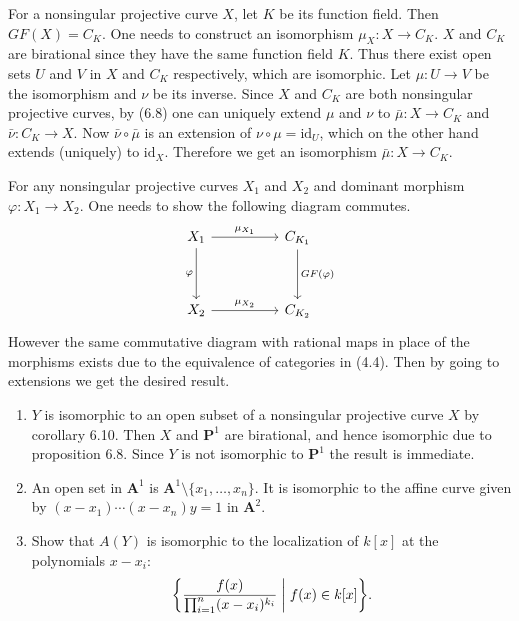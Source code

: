 \documentclass{note}
\newcommand{\Affine}[1]{\mathbf{A}^{#1}}
\newcommand{\Proj}[1]{\mathbf{P}^{#1}}
\newcommand{\id}{\mathrm{id}}
\begin{document}
For a nonsingular projective curve $X$, let $K$ be its function field. Then
$GF(X) = C_K$. One needs to construct an isomorphism $\mu_X\colon X\to C_K$.
$X$ and $C_K$ are birational since they have the same function field $K$. Thus
there exist open sets $U$ and $V$ in $X$ and $C_K$ respectively, which are
isomorphic. Let $\mu\colon U\to V$ be the isomorphism and $\nu$ be its inverse.
Since $X$ and $C_K$ are both nonsingular projective curves, by (6.8) one can
uniquely extend $\mu$ and $\nu$ to $\bar\mu\colon X\to C_K$ and $\bar\nu\colon
  C_K\to X$. Now $\bar\nu\circ\bar\mu$ is an extension of $\nu\circ\mu = \id_U$,
which on the other hand extends (uniquely) to $\id_X$. Therefore we get an
isomorphism $\bar\mu\colon X\to C_K$.

For any nonsingular projective curves $X_1$ and $X_2$ and dominant morphism
$\varphi\colon X_1\to X_2$. One needs to show the following diagram commutes.
\begin{equation*}
  \begin{tikzcd}[row sep=huge,column sep=huge]
    X_1 \arrow{r}{\mu_{X_1}} \arrow[swap]{d}{\varphi} & C_{K_1}
    \arrow{d}{GF(\varphi)} \\ X_2 \arrow{r}{\mu_{X_2}} & C_{K_2}
  \end{tikzcd}
\end{equation*}
However the same commutative diagram with rational maps in place of the
morphisms exists due to the equivalence of categories in (4.4). Then by going
to extensions we get the desired result.


\Ex
\begin{enumerate}
  \item $Y$ is isomorphic to an open subset of a nonsingular projective
        curve $X$ by corollary 6.10. Then $X$ and $\Proj1$ are birational, and hence
        isomorphic due to proposition 6.8. Since $Y$ is not isomorphic to $\Proj1$ the
        result is immediate.
  \item An open set in $\Affine1$ is
        $\Affine1\setminus\{x_1,\dots,x_n\}$. It is isomorphic to the affine curve
        given by $(x-x_1)\cdots(x-x_n)y=1$ in $\Affine2$.
  \item Show that $A(Y)$ is
        isomorphic to the localization of $k[x]$ at the polynomials $x-x_i\colon$
        \begin{equation*}
          \left\{ \frac{f(x)}{\prod_{i=1}^n(x-x_i)^{k_i}} \biggm\vert
          f(x) \in k[x] \right\}.
        \end{equation*}
\end{enumerate}
\end{document}
